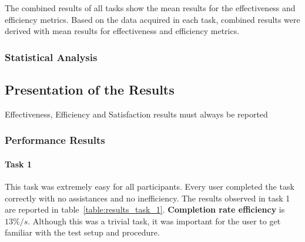 \documentclass[a4paper]{article}
\begin{document}
  The combined results of all tasks show the mean results for the effectiveness and efficiency metrics.
  Based on the data acquired in each task, combined results were derived with mean results for effectiveness and efficiency metrics.
  
\subsubsection{Statistical Analysis}
\subsection{Presentation of the Results}
   Effectiveness, Efficiency and Satisfaction results must always be reported

\subsubsection{Performance Results}
 
 \paragraph{Task 1} This task was extremely easy for all participants. Every user completed the task correctly with no assistances and no inefficiency. The results observed in task 1 are reported in table~\ref{table:results_task_1}. \textbf{Completion rate efficiency} is $13\%/s$. Although this was a trivial task, it was important for the user to get familiar with the test setup and procedure.
 
\end{document}
